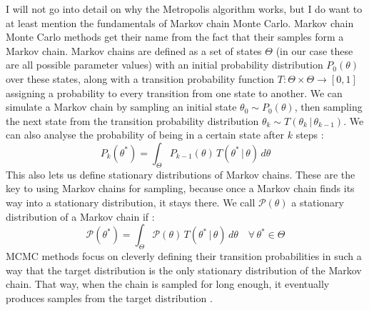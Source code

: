 \documentclass[12pt, a4paper]{report}
\begin{document}
I will not go into detail on why the Metropolis algorithm works, but I do want to at least mention the fundamentals of Markov chain Monte Carlo.
Markov chain Monte Carlo methods get their name from the fact that their samples form a Markov chain.
Markov chains are defined as a set of states $\Theta$ (in our case these are all possible parameter values) with an initial probability distribution $P_0(\theta)$ over these states, along with a transition probability function $T: \Theta \times \Theta \rightarrow [0,1]$ assigning a probability to every transition from one state to another.
We can simulate a Markov chain by sampling an initial state $\theta_0 \sim P_0(\theta)$, then sampling the next state from the transition probability distribution $\theta_k \sim T(\theta_k \,|\, \theta_{k-1})$.
We can also analyse the probability of being in a certain state after $k$ steps \cite[372]{mckay}: 
$$
    P_k(\theta^*) = \int_{\Theta} P_{k-1}(\theta) \, T(\theta^* \,|\, \theta) \, d\theta 
$$
This also lets us define stationary distributions of Markov chains.
These are the key to using Markov chains for sampling, because once a Markov chain finds its way into a stationary distribution, it stays there.
We call $\mathcal{P}(\theta)$ a stationary distribution of a Markov chain if \cite[372]{mckay}:
$$
    \mathcal{P}(\theta^*) = \int_{\Theta} \mathcal{P}(\theta) \, T(\theta^* \,|\, \theta) \, d\theta \quad \forall \, \theta^* \in \Theta
$$
MCMC methods focus on cleverly defining their transition probabilities in such a way that the target distribution is the only stationary distribution of the Markov chain.
That way, when the chain is sampled for long enough, it eventually produces samples from the target distribution \cite[372]{mckay}.
\end{document}
